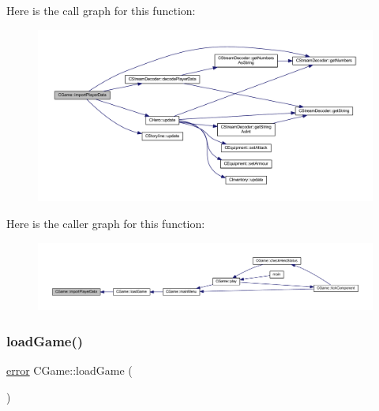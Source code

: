 Here is the call graph for this function\+:\nopagebreak
\begin{figure}[H]
\begin{center}
\leavevmode
\includegraphics[width=350pt]{class_c_game_a507b71eeebc2a6aaa08d9e0dcb61c7ac_cgraph}
\end{center}
\end{figure}
Here is the caller graph for this function\+:\nopagebreak
\begin{figure}[H]
\begin{center}
\leavevmode
\includegraphics[width=350pt]{class_c_game_a507b71eeebc2a6aaa08d9e0dcb61c7ac_icgraph}
\end{center}
\end{figure}
\mbox{\label{class_c_game_accda079824fc813cbd64b4743846ae24}} 
\subsubsection{\texorpdfstring{load\+Game()}{loadGame()}}
{\footnotesize\ttfamily \mbox{\hyperlink{_errors_list_8h_af10dacfa214e2575bb2e0ee407c242e0}{error}} C\+Game\+::load\+Game (\begin{DoxyParamCaption}{ }\end{DoxyParamCaption})\hspace{0.3cm}{\ttfamily [protected]}}

